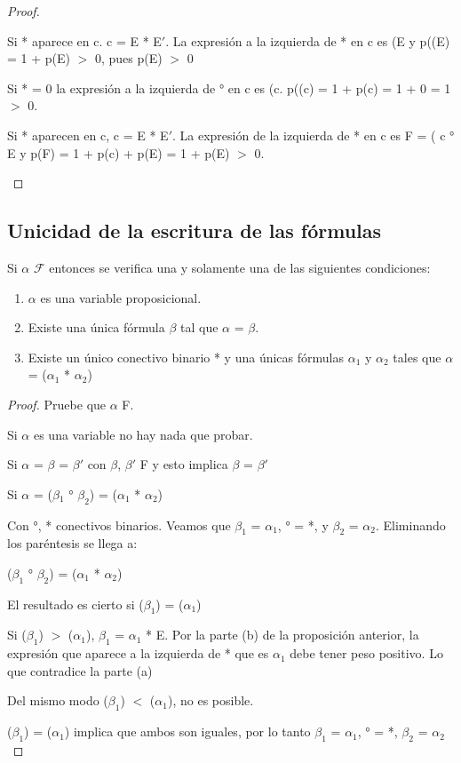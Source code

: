 \begin{proof}
\begin{enumerate}
	Si * aparece en c. c = E * E$'$. La expresi\'on a la izquierda de * en c			 es (E y p((E) = 1 + p(E) $>$ 0, pues p(E) $>$ 0

	Si * = 0 la expresi\'on a la izquierda de ° en c es (c. p((c) = 1 + 		p(c) = 1 + 0 = 1 $>$ 0.

	Si * aparecen en c, c = E * E$'$. La expresi\'on de la izquierda de * en c		 es F = ( c ° E y p(F) = 1 + p(c) + p(E) = 1 + p(E) $>$ 0.
\end{enumerate}

\end{proof}

\subsection{Unicidad de la escritura de las f\'ormulas}

Si $\alpha$ \cin $\mathcal{F}$ entonces se verifica una y solamente una de las siguientes condiciones:

\begin{enumerate}
	\item $\alpha$ es una variable proposicional.
	\item Existe una \'unica f\'ormula $\beta$ tal que $\alpha$ = \cneg $\beta$.
	\item Existe un \'unico conectivo binario *  y una \'unicas f\'ormulas $\alpha_1$ y $\alpha_2$ tales que $\alpha$ = ($\alpha_1$ * $\alpha_2$)
\end{enumerate}

\begin{proof}

Pruebe que $\alpha$ \cin F.

Si $\alpha$ es una variable no hay nada que probar.

Si $\alpha$ = \cneg $\beta$ = \cneg $\beta '$ con $\beta$, $\beta'$ \cin F y esto implica $\beta$ = $\beta'$

Si $\alpha$ = (\textsc{$\beta_1$} ° $\beta_2$) = ($\alpha_1$ * $\alpha_2$)

Con °, * conectivos binarios. Veamos que $\beta_1$ = $\alpha_1$, ° = *, y $\beta_2$ = $\alpha_2$. Eliminando los par\'entesis se llega a:

($\beta_1$ ° $\beta_2$) = ($\alpha_1$ * $\alpha_2$)

El resultado es cierto si \length($\beta_1$) = \length($\alpha_1$)

Si \length($\beta_1$) $>$ \length($\alpha_1$), \then $\beta_1$ = $\alpha_1$ * E. Por la parte (b) de la proposici\'on anterior, la expresi\'on que aparece a la izquierda de * que es $\alpha_1$ debe tener peso positivo. Lo que contradice la parte (a)

Del mismo modo \length($\beta_1$) $<$ \length($\alpha_1$), no es posible.

\length($\beta_1$) = \length($\alpha_1$) \then implica que ambos son iguales, por lo tanto
$\beta_1$ = $\alpha_1$, ° = *, $\beta_2$ = $\alpha_2$

\end{proof}